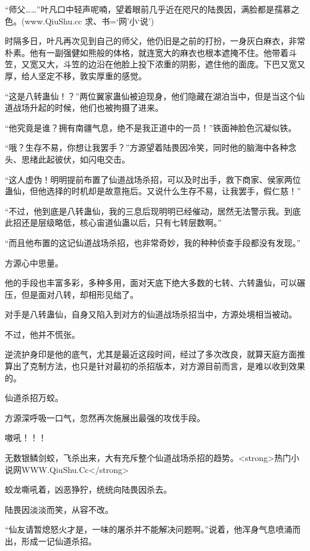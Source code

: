 
\begin{this_body}

“师父……”叶凡口中轻声呢喃，望着眼前几乎近在咫尺的陆畏因，满脸都是孺慕之色。(www.QiuShu.cc 求、书=‘网’小‘说’)

时隔多日，叶凡再次见到自己的师父，他仍旧是之前的打扮，一身灰白麻衣，非常朴素。他有一副强健如熊般的体格，就连宽大的麻衣也根本遮掩不住。他带着斗笠，又宽又大，斗笠的边沿在他脸上投下浓重的阴影，遮住他的面庞。下巴又宽又厚，给人坚定不移，敦实厚重的感觉。

“这是八转蛊仙！？”两位翼家蛊仙被迫现身，他们隐藏在湖泊当中，但是当这个仙道战场升起的时候，他们也被拘摄了进来。

“他究竟是谁？拥有南疆气息，绝不是我正道中的一员！”铁面神脸色沉凝似铁。

“哦？生存不易，你想让我罢手？”方源望着陆畏因冷笑，同时他的脑海中各种念头、思绪此起彼伏，如闪电交击。

“这人虚伪！明明提前布置了仙道战场杀招，可以及时出手，救下商家、侯家两位蛊仙，但他选择的时机却是故意拖后。又说什么生存不易，让我罢手，假仁慈！”

“不过，他到底是八转蛊仙，我的三息后现明明已经催动，居然无法警示我。到底此招还是层级略低，核心宙道仙蛊以后，只有七转层数啊。”

“而且他布置的这记仙道战场杀招，也非常奇妙，我的种种侦查手段都没有发现。”

方源心中思量。

他的手段也丰富多彩，多种多用，面对天底下绝大多数的七转、六转蛊仙，可以碾压，但是面对八转，却相形见绌了。

对手是八转蛊仙，自身又陷入到对方的仙道战场杀招当中，方源处境相当被动。

不过，他并不慌张。

逆流护身印是他的底气，尤其是最近这段时间，经过了多次改良，就算天庭方面推算出了克制方法，也只是针对最初的杀招版本，对方源目前而言，是难以收到效果的。

仙道杀招万蛟。

方源深呼吸一口气，忽然再次施展出最强的攻伐手段。

嗷吼！！！

无数银鳞剑蛟，飞杀出来，大有充斥整个仙道战场杀招的趋势。<strong>热门小说网WWW.QiuShu.Cc</strong>

蛟龙嘶吼着，凶恶狰狞，统统向陆畏因杀去。

陆畏因淡淡而笑，从容不改。

“仙友请暂熄怒火才是，一味的屠杀并不能解决问题啊。”说着，他浑身气息喷涌而出，形成一记仙道杀招。


\end{this_body}
